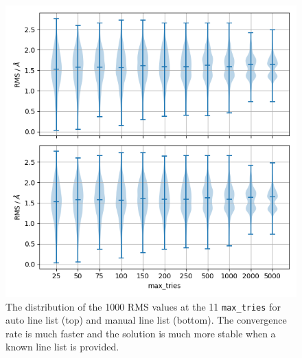 \documentclass{aa}
\begin{document}
\begin{figure}[h]
    \centering
    \includegraphics[width=\columnwidth]{figure_3_rms.png}
    \caption{The distribution of the 1000 RMS values at the 11 \texttt{max\_tries} for auto line list (top) and manual line list (bottom). The convergence rate is much faster and the solution is much more stable when a known line list is provided.}
    \label{fig:rms}
\end{figure}
\end{document}
